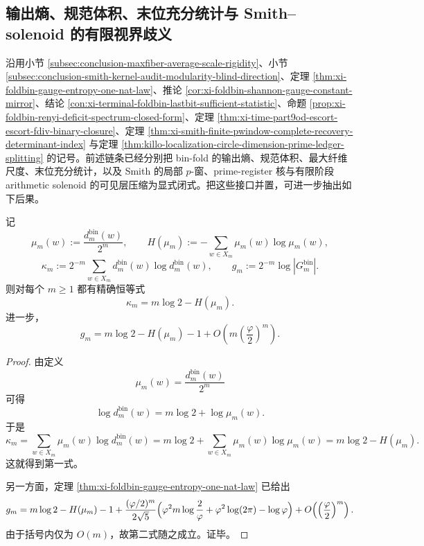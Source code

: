 \subsection{输出熵、规范体积、末位充分统计与 Smith--solenoid 的有限视界歧义}\label{subsec:conclusion-fold-entropy-gauge-onebit-smith-solenoid-horizon}
沿用小节 \ref{subsec:conclusion-maxfiber-average-scale-rigidity}、小节 \ref{subsec:conclusion-smith-kernel-audit-modularity-blind-direction}、定理 \ref{thm:xi-foldbin-gauge-entropy-one-nat-law}、推论 \ref{cor:xi-foldbin-shannon-gauge-constant-mirror}、结论 \ref{con:xi-terminal-foldbin-lastbit-sufficient-statistic}、命题 \ref{prop:xi-foldbin-renyi-deficit-spectrum-closed-form}、定理 \ref{thm:xi-time-part9od-escort-escort-fdiv-binary-closure}、定理 \ref{thm:xi-smith-finite-pwindow-complete-recovery-determinant-index} 与定理 \ref{thm:killo-localization-circle-dimension-prime-ledger-splitting} 的记号。前述链条已经分别把 bin-fold 的输出熵、规范体积、最大纤维尺度、末位充分统计，以及 Smith 的局部 \(p\)-窗、prime-register 核与有限阶段 arithmetic solenoid 的可见层压缩为显式闭式。把这些接口并置，可进一步抽出如下后果。

\begin{theorem}[输出熵与规范体积密度的仿射恒等式]\label{thm:conclusion-fold-output-entropy-gauge-affine-identity}
记
\[
\mu_m(w):=\frac{d_m^{\mathrm{bin}}(w)}{2^m},
\qquad
H(\mu_m):=-\sum_{w\in X_m}\mu_m(w)\log\mu_m(w),
\]
\[
\kappa_m:=2^{-m}\sum_{w\in X_m}d_m^{\mathrm{bin}}(w)\log d_m^{\mathrm{bin}}(w),
\qquad
g_m:=2^{-m}\log|G_m^{\mathrm{bin}}|.
\]
则对每个 \(m\ge 1\) 都有精确恒等式
\[
\kappa_m=m\log 2-H(\mu_m).
\]
进一步，
\[
g_m
=
m\log 2-H(\mu_m)-1
+O\!\left(m\left(\frac{\varphi}{2}\right)^m\right).
\]
\end{theorem}
\begin{proof}
由定义
\[
\mu_m(w)=\frac{d_m^{\mathrm{bin}}(w)}{2^m}
\]
可得
\[
\log d_m^{\mathrm{bin}}(w)=m\log 2+\log\mu_m(w).
\]
于是
\[
\kappa_m
=
\sum_{w\in X_m}\mu_m(w)\log d_m^{\mathrm{bin}}(w)
=
m\log 2+\sum_{w\in X_m}\mu_m(w)\log\mu_m(w)
=
m\log 2-H(\mu_m).
\]
这就得到第一式。

另一方面，定理 \ref{thm:xi-foldbin-gauge-entropy-one-nat-law} 已给出
\[
g_m
=
m\log 2-H(\mu_m)-1
+\frac{(\varphi/2)^m}{2\sqrt5}
\Bigl(
\varphi^2 m\log\frac{2}{\varphi}
+\varphi^2\log(2\pi)-\log\varphi
\Bigr)
+O\!\left(\left(\frac{\varphi}{2}\right)^m\right).
\]
由于括号内仅为 \(O(m)\)，故第二式随之成立。证毕。
\end{proof}

